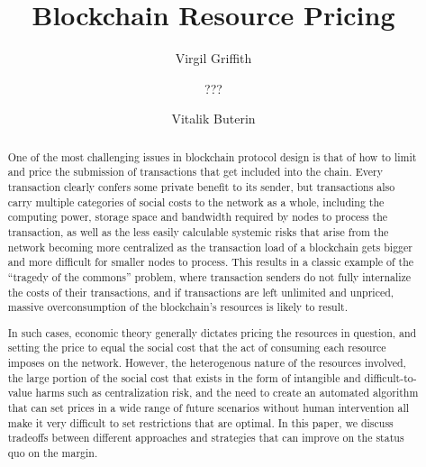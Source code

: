 \documentclass[12pt, final]{article}
\author{Virgil Griffith}
\author{???}
\author{Vitalik Buterin}
\title{Blockchain Resource Pricing}
\begin{document}
\maketitle
\vspace{-0.2in} \TODO{\today}





\begin{abstract}

One of the most challenging issues in blockchain protocol design is that of how to limit and price the submission of transactions that get included into the chain. Every transaction clearly confers some private benefit to its sender, but transactions also carry multiple categories of social costs to the network as a whole, including the computing power, storage space and bandwidth required by nodes to process the transaction, as well as the less easily calculable systemic risks that arise from the network becoming more centralized as the transaction load of a blockchain gets bigger and more difficult for smaller nodes to process. This results in a classic example of the ``tragedy of the commons'' problem, where transaction senders do not fully internalize the costs of their transactions, and if transactions are left unlimited and unpriced, massive overconsumption of the blockchain's resources is likely to result.

In such cases, economic theory generally dictates pricing the resources in question, and setting the price to equal the social cost that the act of consuming each resource imposes on the network. However, the heterogenous nature of the resources involved, the large portion of the social cost that exists in the form of intangible and difficult-to-value harms such as centralization risk, and the need to create an automated algorithm that can set prices in a wide range of future scenarios without human intervention all make it very difficult to set restrictions that are optimal. In this paper, we discuss tradeoffs between different approaches and strategies that can improve on the status quo on the margin.
\end{abstract}

\end{document}
